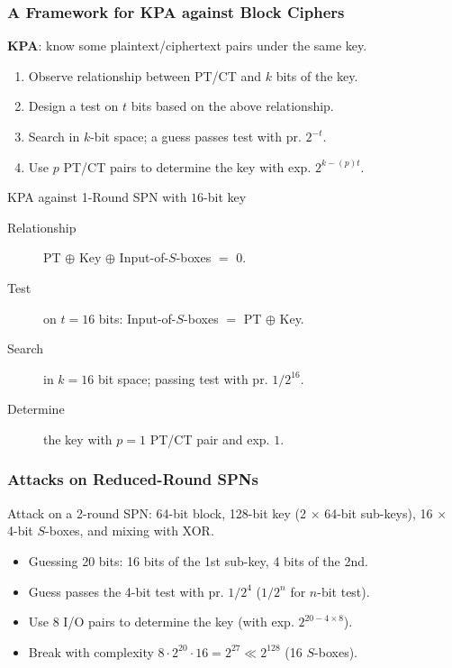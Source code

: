 \begin{frame}\frametitle{A Framework for KPA against Block Ciphers}
\textbf{KPA}: know some plaintext/ciphertext pairs under the same key.
\begin{enumerate}
\item Observe relationship between PT/CT and $k$ bits of the key. 
\item Design a test on $t$ bits based on the above relationship.
\item Search in $k$-bit space; a guess passes test with pr. $2^{-t}$.
\item Use $p$ PT/CT pairs to determine the key with exp. $2^{k-(p)t}$.
\end{enumerate}
\begin{exampleblock}{KPA against 1-Round SPN with $16$-bit key}
\begin{description}
\item[Relationship] PT $\oplus$ Key $\oplus$ Input-of-$S$-boxes $=$ 0.
\item[Test] on $t=16$ bits: Input-of-$S$-boxes $=$ PT $\oplus$ Key.
\item[Search] in $k=16$ bit space; passing test with pr. $1/2^{16}$.
\item[Determine] the key with $p=1$ PT/CT pair and exp. $1$.
\end{description}
\end{exampleblock}
\end{frame}
\begin{frame}\frametitle{Attacks on Reduced-Round SPNs}
Attack on a 2-round SPN: 64-bit block, 128-bit key (2 $\times$ 64-bit sub-keys), 16 $\times$ 4-bit $S$-boxes, and mixing with XOR.
\begin{figure}
\begin{center}

\end{center}
\end{figure}
\begin{itemize}
\item Guessing 20 bits: 16 bits of the 1st sub-key, 4 bits of the 2nd.
\item Guess passes the 4-bit test with pr. $1/2^4$ ($1/2^n$ for $n$-bit test).
\item Use 8 I/O pairs to determine the key (with exp. $2^{20 - 4\times 8}$).
\item Break with complexity $8\cdot 2^{20} \cdot 16= 2^{27} \ll 2^{128}$ (16 $S$-boxes).
\end{itemize}
\end{frame}
